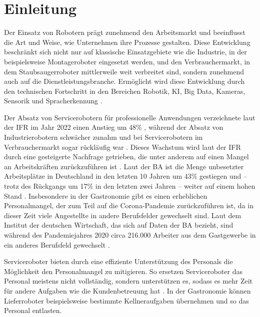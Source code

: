\section{Einleitung}
Der Einsatz von Robotern prägt zunehmend den Arbeitsmarkt und beeinflusst die Art und Weise, wie Unternehmen ihre Prozesse gestalten. Diese Entwicklung beschränkt sich nicht nur auf klassische Einsatzgebiete wie die Industrie, in der beispielsweise Montageroboter eingesetzt werden, und den Verbrauchermarkt, in dem Staubsaugerroboter mittlerweile weit verbreitet sind, sondern zunehmend auch auf die Dienstleistungsbranche. Ermöglicht wird diese Entwicklung durch den technischen Fortschritt in den Bereichen Robotik, \ac{KI}, Big Data, Kameras, Sensorik und Spracherkennung \cite[S.~424]{Paluch2020}.

Der Absatz von Servicerobotern für professionelle Anwendungen verzeichnete laut der \ac{IFR} im Jahr 2022 einen Anstieg um 48\% \cite[S.~1]{IFR2023}, während der Absatz von Industrierobotern schwächer zunahm \cite[S.~9]{WorldRobotics2023} und bei Servicerobotern im Verbrauchermarkt sogar rückläufig war \cite[S.~37]{WorldRobotics2023}. Dieses Wachstum wird laut der \ac{IFR} durch eine gesteigerte Nachfrage getrieben, die unter anderem auf einen Mangel an Arbeitskräften zurückzuführen ist \cite[S.~33-34]{WorldRobotics2023}. Laut der \ac{BA} ist die Menge unbesetzter Arbeitsplätze in Deutschland in den letzten 10 Jahren um 43\% gestiegen und – trotz des Rückgangs um 17\% in den letzten zwei Jahren – weiter auf einem hohen Stand \cite{BA2024}. Insbesondere in der Gastronomie gibt es einen erheblichen Personalmangel, der zum Teil auf die Corona-Pandemie zurückzuführen ist, da in dieser Zeit viele Angestellte in andere Berufsfelder gewechselt sind. Laut dem Institut der deutschen Wirtschaft, das sich auf Daten der \ac{BA} bezieht, sind während des Pandemiejahres 2020 circa 216.000 Arbeiter aus dem Gastgewerbe in ein anderes Berufsfeld gewechselt \cite[S.~1]{Jansen2022}.

Serviceroboter bieten durch eine effiziente Unterstützung des Personals die Möglichkeit den Personalmangel zu mitigieren. So ersetzen Serviceroboter das Personal meistens nicht vollständig, sondern unterstützen es, sodass es mehr Zeit für andere Aufgaben wie die Kundenbetreuung hat \cite[S.~271-272]{Sprenger2015}. In der Gastronomie können Lieferroboter beispielsweise bestimmte Kellneraufgaben übernehmen und so das Personal entlasten.

